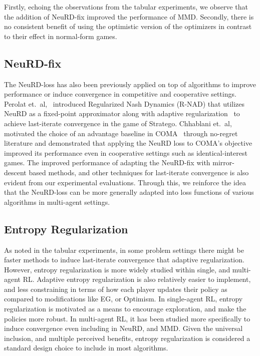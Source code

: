Firstly, echoing the observations from the tabular experiments, we observe that the addition of
NeuRD-fix improved the performance of MMD.
Secondly, there is no consistent benefit of using the optimistic version of the optimizers in
contrast to their effect in normal-form games.


\subsection{NeuRD-fix}
The NeuRD-loss has also been previously applied on top of algorithms to improve performance or
induce convergence in competitive and cooperative settings.
Perolat et.~al,~\cite{perolatMastering2022} introduced Regularized Nash Dynamics (R-NAD) that
utilizes NeuRD as a fixed-point approximator along with adaptive
regularization~\cite{perolatPoincare2021} to achieve last-iterate convergence in the game of
Stratego.
Chhablani et.~al,~\cite{chhablaniCounterfactual2021} motivated the choice of an advantage baseline
in COMA~\cite{foersterCounterfactual2018} through no-regret literature and demonstrated that
applying the NeuRD loss to COMA's objective improved its performance even in cooperative settings
such as identical-interest games.
The improved performance of adapting the NeuRD-fix with mirror-descent based methods, and other
techniques for last-iterate convergence is also evident from our experimental evaluations.
Through this, we reinforce the idea that the NeuRD-loss can be more generally adapted into loss
functions of various algorithms in multi-agent settings.

\subsection{Entropy Regularization}
As noted in the tabular experiments, in some problem settings there might be faster methods to
induce last-iterate convergence that adaptive regularization.
However, entropy regularization is more widely studied within single, and multi-agent RL.
Adaptive entropy regularization is also relatively easier to implement, and less constraining in
terms of how each player updates their policy as compared to modifications like EG, or Optimism.
In single-agent RL, entropy regularization is motivated as a means to encourage exploration, and
make the policies more robust.
In multi-agent RL, it has been studied more specifically to induce convergence even including in
NeuRD, and MMD.
Given the universal inclusion, and multiple perceived benefits, entropy regularization is
considered a standard design choice to include in most algorithms.

